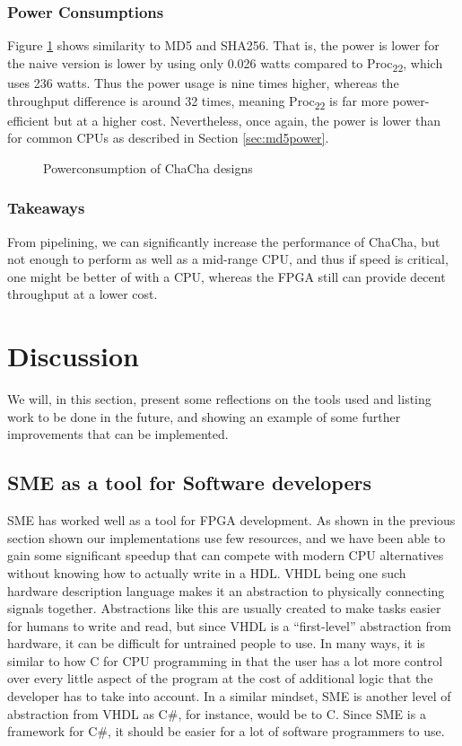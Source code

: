 \documentclass[a4paper, openany]{book}
\begin{document}
\subsection{Power Consumptions}
\label{sec:orgcb2710d}
Figure \ref{fig:ChaCha_power} shows similarity to MD5 and SHA256. That is, the power is lower for the naive version is lower by using only 0.026 watts compared to Proc\textsubscript{22}, which uses 236 watts. Thus the power usage is nine times higher, whereas the throughput difference is around 32 times, meaning Proc\textsubscript{22} is far more power-efficient but at a higher cost. Nevertheless, once again, the power is lower than for common CPUs as described in Section \ref{sec:md5power}.

\begin{figure}[H]
\centering
{}
\caption[Power consumption of ChaCha20 designs]
{Powerconsumption of ChaCha designs}
\label{fig:ChaCha_power}
\end{figure}
\subsection{Takeaways}
\label{sec:org6a59270}
From pipelining, we can significantly increase the performance of ChaCha, but not enough to perform as well as a mid-range CPU, and thus if speed is critical, one might be better of with a CPU, whereas the FPGA still can provide decent throughput at a lower cost.

\chapter{Discussion}
\label{sec:org650e979}
We will, in this section, present some reflections on the tools used and listing work to be done in the future, and showing an example of some further improvements that can be implemented.

\section{SME as a tool for Software developers}
\label{sec:orgbc22f03}
SME has worked well as a tool for FPGA development. As shown in the previous section shown our implementations use few resources, and we have been able to gain some significant speedup that can compete with modern CPU alternatives without knowing how to actually write in a HDL. VHDL being one such hardware description language makes it an abstraction to physically connecting signals together.
Abstractions like this are usually created to make tasks easier for humans to write and read,
but since VHDL is a ``first-level'' abstraction from hardware, it can be difficult for untrained people to use. In many ways, it is similar to how C for CPU programming in that the user has a lot more control over every little aspect of the program at the cost of additional logic that the developer has to take into account.
In a similar mindset, SME is another level of abstraction from VHDL as C\#, for instance, would be to C. Since SME is a framework for C\#, it should be easier for a lot of software programmers to use.
\end{document}
